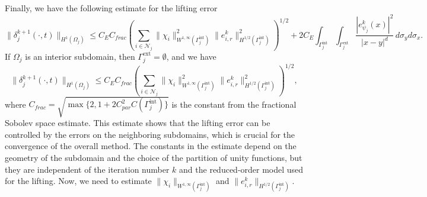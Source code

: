 \documentclass[a4paper, 11pt]{article}
\theoremstyle{remark}
\begin{document}
Finally, we have the following estimate for the lifting error
\begin{equation*}
    \|\delta_{j}^{k+1}(\cdot, t)\|_{H^{1}(\Omega_{j})} \leq C_{E}C_{frac}\left(\sum_{i\in\mathcal{N}_{j}}\|\chi_{i}\|_{W^{1, \infty}(\Gamma_j^{\text{int}})}^{2}\|e_{i,r}^{k}\|_{H^{1/2}(\Gamma_j^{\text{int}})}^{2}\right)^{1/2} + 2 C_{E}\int_{\Gamma_j^{\text{int}}} \int_{\Gamma_j^{\text{ext}}} \frac{|e_{\psi_{j}}^{k}(x)|^2}{|x-y|^{d}} \, d\sigma_y d\sigma_x.
\end{equation*}
If $\Omega_{j}$ is an interior subdomain, then $\Gamma_j^{\text{ext}} = \emptyset$, and we have
\begin{equation*}
    \|\delta_{j}^{k+1}(\cdot, t)\|_{H^{1}(\Omega_{j})} \leq C_{E}C_{frac}\left(\sum_{i\in\mathcal{N}_{j}}\|\chi_{i}\|_{W^{1, \infty}(\Gamma_j^{\text{int}})}^{2}\|e_{i,r}^{k}\|_{H^{1/2}(\Gamma_j^{\text{int}})}^{2}\right)^{1/2},                                                 
\end{equation*}
where $C_{frac} = \sqrt{\max\{2, 1 + 2C_{par}^{2}C(\Gamma_{j}^{\text{int}})\}}$ is the constant from the fractional Sobolev space estimate.
This estimate shows that the lifting error can be controlled by the errors on the neighboring subdomains, which is crucial for the convergence of the overall method. 
The constants in the estimate depend on the geometry of the subdomain and the choice of the partition of unity functions, but they are independent of the iteration number 
$k$ and the reduced-order model used for the lifting. Now, we need to estimate $\|\chi_{i}\|_{W^{1, \infty}(\Gamma_j^{\text{int}})}$ and 
$\|e_{i,r}^{k}\|_{H^{1/2}(\Gamma_j^{\text{int}})}$.
\end{document}
